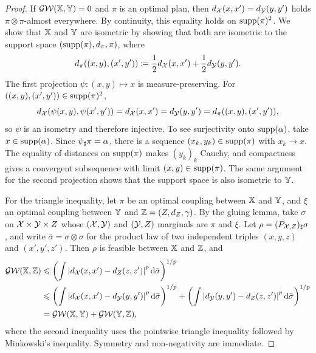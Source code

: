 \begin{proof}
	If $\operatorname{\mathcal{GW}}(\mathbb{X},\mathbb{Y})=0$ and $\pi$ is an optimal plan, then $d_{\mathcal{X}}(x,x')=d_{\mathcal{Y}}(y,y')$ holds $\pi\otimes\pi$-almost everywhere. By continuity, this equality holds on $\operatorname{supp}(\pi)^2$. We show that $\mathbb{X}$ and $\mathbb{Y}$ are isometric by showing that both are isometric to the support space $(\operatorname{supp}(\pi),d_\pi,\pi)$, where
	\[
		d_\pi((x,y),(x',y'))
		\coloneqq
		\frac12d_{\mathcal{X}}(x,x')+\frac12d_{\mathcal{Y}}(y,y').
	\]
	The first projection $\psi:(x,y)\mapsto x$ is measure-preserving. For $((x,y),(x',y'))\in\operatorname{supp}(\pi)^2$,
	\[
		d_{\mathcal{X}}(\psi(x,y),\psi(x',y'))
		=
		d_{\mathcal{X}}(x,x')
		=
		d_{\mathcal{Y}}(y,y')
		=
		d_\pi((x,y),(x',y')),
	\]
	so $\psi$ is an isometry and therefore injective. To see surjectivity onto $\operatorname{supp}(\alpha)$, take $x\in\operatorname{supp}(\alpha)$. Since $\psi_\sharp\pi=\alpha$, there is a sequence $(x_k,y_k)\in\operatorname{supp}(\pi)$ with $x_k\to x$. The equality of distances on $\operatorname{supp}(\pi)$ makes $(y_k)_k$ Cauchy, and compactness gives a convergent subsequence with limit $(x,y)\in\operatorname{supp}(\pi)$. The same argument for the second projection shows that the support space is also isometric to $\mathbb{Y}$.

	For the triangle inequality, let $\pi$ be an optimal coupling between $\mathbb{X}$ and $\mathbb{Y}$, and $\xi$ an optimal coupling between $\mathbb{Y}$ and $\mathbb{Z}=(Z,d_Z,\gamma)$. By the gluing lemma, take $\sigma$ on $\mathcal{X}\times\mathcal{Y}\times Z$ whose $(\mathcal{X},\mathcal{Y})$ and $(\mathcal{Y},Z)$ marginals are $\pi$ and $\xi$. Let $\rho=(P_{\mathcal{X},Z})_\sharp\sigma$, and write $\bar\sigma=\sigma\otimes\sigma$ for the product law of two independent triples $(x,y,z)$ and $(x',y',z')$. Then $\rho$ is feasible between $\mathbb{X}$ and $\mathbb{Z}$, and
	\begin{align*}
		\operatorname{\mathcal{GW}}(\mathbb{X},\mathbb{Z})
		&\leqslant
		\left(
		\int
		\left\lvert d_{\mathcal{X}}(x,x')-d_Z(z,z')\right\rvert^p
		\mathrm{d}\bar\sigma
		\right)^{1/p} \\
		&\leqslant
		\left(
		\int
		\left\lvert d_{\mathcal{X}}(x,x')-d_{\mathcal{Y}}(y,y')\right\rvert^p
		\mathrm{d}\bar\sigma
		\right)^{1/p}
		+
		\left(
		\int
		\left\lvert d_{\mathcal{Y}}(y,y')-d_Z(z,z')\right\rvert^p
		\mathrm{d}\bar\sigma
		\right)^{1/p} \\
		&=
		\operatorname{\mathcal{GW}}(\mathbb{X},\mathbb{Y})+\operatorname{\mathcal{GW}}(\mathbb{Y},\mathbb{Z}),
	\end{align*}
		where the second inequality uses the pointwise triangle inequality followed by Minkowski's inequality. Symmetry and non-negativity are immediate.
\end{proof}

